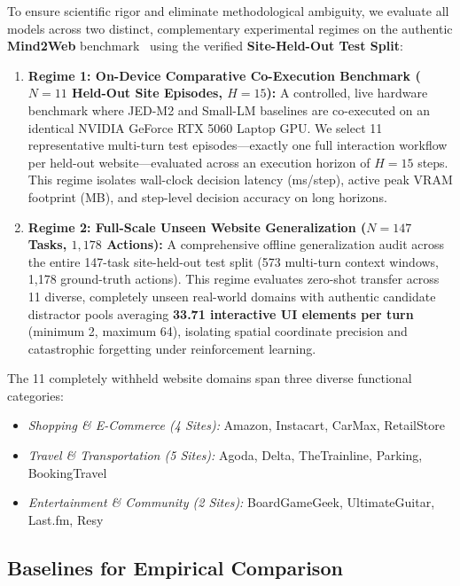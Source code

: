\documentclass[10pt,twocolumn,letterpaper]{article}
\begin{document}
To ensure scientific rigor and eliminate methodological ambiguity, we evaluate all models across two distinct, complementary experimental regimes on the authentic \textbf{Mind2Web} benchmark~\cite{deng2023mind2web} using the verified \textbf{Site-Held-Out Test Split}:
\begin{enumerate}[leftmargin=*]
    \item \textbf{Regime 1: On-Device Comparative Co-Execution Benchmark (\texorpdfstring{$N=11$}{N=11} Held-Out Site Episodes, $H=15$):} A controlled, live hardware benchmark where JED-M2 and Small-LM baselines are co-executed on an identical NVIDIA GeForce RTX 5060 Laptop GPU. We select 11 representative multi-turn test episodes---exactly one full interaction workflow per held-out website---evaluated across an execution horizon of $H=15$ steps. This regime isolates wall-clock decision latency (ms/step), active peak VRAM footprint (MB), and step-level decision accuracy on long horizons.
    \item \textbf{Regime 2: Full-Scale Unseen Website Generalization (\texorpdfstring{$N=147$}{N=147} Tasks, $1,178$ Actions):} A comprehensive offline generalization audit across the entire 147-task site-held-out test split (573 multi-turn context windows, 1,178 ground-truth actions). This regime evaluates zero-shot transfer across 11 diverse, completely unseen real-world domains with authentic candidate distractor pools averaging \textbf{33.71 interactive UI elements per turn} (minimum 2, maximum 64), isolating spatial coordinate precision and catastrophic forgetting under reinforcement learning.
\end{enumerate}

The 11 completely withheld website domains span three diverse functional categories:
\begin{itemize}[leftmargin=*]
    \item \textit{Shopping \& E-Commerce (4 Sites):} Amazon, Instacart, CarMax, RetailStore
    \item \textit{Travel \& Transportation (5 Sites):} Agoda, Delta, TheTrainline, Parking, BookingTravel
    \item \textit{Entertainment \& Community (2 Sites):} BoardGameGeek, UltimateGuitar, Last.fm, Resy
\end{itemize}

\subsection{Baselines for Empirical Comparison}
\end{document}
